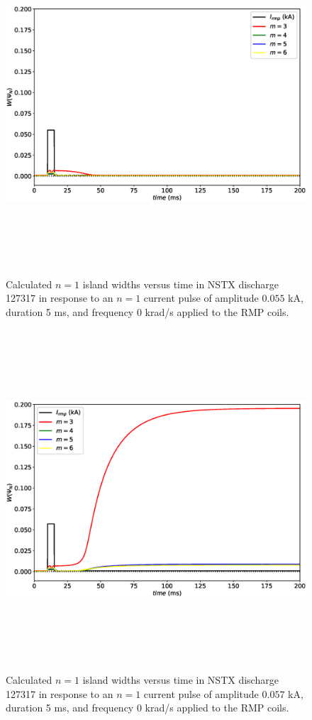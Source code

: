 \documentclass[12pt,prb,aps]{revtex4-1}
\begin{document}
\begin{figure}
\centerline{\includegraphics[height=5in]{Fig4.eps}}
\caption{Calculated $n=1$ island widths  versus time in NSTX discharge 127317 in response to an $n=1$ current pulse of amplitude $0.055$ kA, duration 5 ms, and frequency 0 krad/s applied to the RMP coils.}\label{fig4}
\end{figure}

\begin{figure}
\centerline{\includegraphics[height=5in]{Fig5.eps}}
\caption{Calculated $n=1$ island widths versus time in NSTX discharge 127317 in response to an $n=1$ current pulse of amplitude $0.057$ kA, duration 5 ms, and frequency 0 krad/s applied to the RMP coils.}\label{fig5}
\end{figure}
\end{document}

